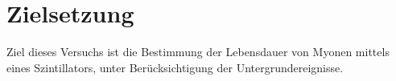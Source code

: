 \section{Zielsetzung}
\label{sec:Zielsetzung}

Ziel dieses Versuchs ist die Bestimmung der Lebensdauer von Myonen mittels eines Szintillators, unter Berücksichtigung der Untergrundereignisse.
